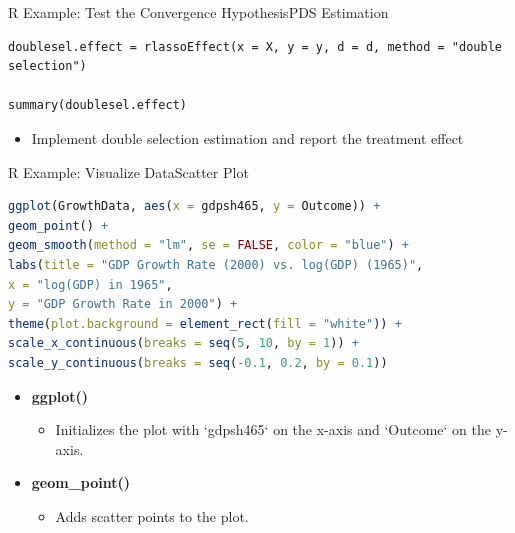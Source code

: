 \documentclass[hyperref={pdfpagelabels=false}]{beamer}
\begin{document}
\begin{frame}[fragile]{R Example: Test the Convergence Hypothesis}{PDS Estimation}
		
\begin{lstlisting}
doublesel.effect = rlassoEffect(x = X, y = y, d = d, method = "double selection")

summary(doublesel.effect)
\end{lstlisting}
		
	\begin{itemize}
		\item Implement double selection estimation and report the treatment effect
		
		
	\end{itemize}
\end{frame}





\begin{frame}[fragile]{R Example: Visualize Data}{Scatter Plot}
\begin{lstlisting}[language=R]
ggplot(GrowthData, aes(x = gdpsh465, y = Outcome)) +
geom_point() +
geom_smooth(method = "lm", se = FALSE, color = "blue") +
labs(title = "GDP Growth Rate (2000) vs. log(GDP) (1965)",
x = "log(GDP) in 1965",
y = "GDP Growth Rate in 2000") +
theme(plot.background = element_rect(fill = "white")) +
scale_x_continuous(breaks = seq(5, 10, by = 1)) +
scale_y_continuous(breaks = seq(-0.1, 0.2, by = 0.1))
\end{lstlisting}
	
	\begin{itemize}
		\item \textbf{ggplot()} 
				\vspace{0.2cm}
		\begin{itemize}
			\item Initializes the plot with `gdpsh465` on the x-axis and `Outcome` on the y-axis.
		\end{itemize}
		\vspace{0.2cm}
		\item \textbf{geom\_point()} 
						\vspace{0.2cm}
		\begin{itemize}
			\item Adds scatter points to the plot.
		\end{itemize}
		
	\end{itemize}
\end{frame}
\end{document}
